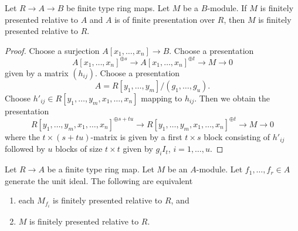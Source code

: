 \begin{lemma}
\label{lemma-composition-relative-finite-presentation}
Let $R \to A \to B$ be finite type ring maps. Let $M$ be a $B$-module.
If $M$ is finitely presented relative to $A$ and $A$ is of finite presentation
over $R$, then $M$ is finitely presented relative to $R$.
\end{lemma}

\begin{proof}
Choose a surjection $A[x_1, \ldots, x_n] \to B$.
Choose a presentation
$$
A[x_1, \ldots, x_n]^{\oplus s} \to
A[x_1, \ldots, x_n]^{\oplus t} \to M \to 0
$$
given by a matrix $(h_{ij})$. Choose a presentation
$$
A = R[y_1, \ldots, y_m]/(g_1, \ldots, g_u).
$$
Choose $h'_{ij} \in R[y_1, \ldots, y_m, x_1, \ldots, x_n]$
mapping to $h_{ij}$. Then we obtain the presentation
$$
R[y_1, \ldots, y_m, x_1, \ldots, x_n]^{\oplus s + tu} \to
R[y_1, \ldots, y_m, x_1, \ldots, x_n]^{\oplus t} \to M \to 0
$$
where the $t \times (s + tu)$-matrix is given by a first $t \times s$ block
consisting of $h'_{ij}$ followed by $u$ blocks of size $t \times t$ given
by $g_iI_t$, $i = 1, \ldots, u$.
\end{proof}

\begin{lemma}
\label{lemma-glue-relative-finite-presentation}
Let $R \to A$ be a finite type ring map. Let $M$ be an $A$-module.
Let $f_1, \ldots, f_r \in A$ generate the unit ideal.
The following are equivalent
\begin{enumerate}
\item each $M_{f_i}$ is finitely presented relative to $R$, and
\item $M$ is finitely presented relative to $R$.
\end{enumerate}
\end{lemma}

